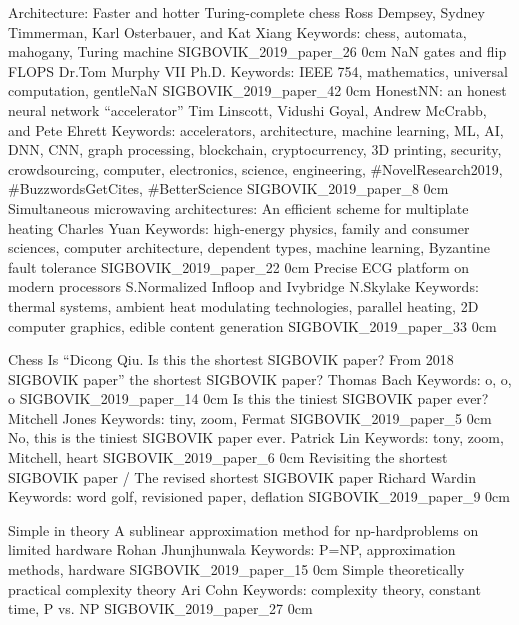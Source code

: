 \addtrack
	{}{Architecture: Faster and hotter}
\addpaper
	{Turing-complete chess}
	{Ross Dempsey, Sydney Timmerman, Karl Osterbauer, and Kat Xiang}
	{Keywords: chess, automata, mahogany, Turing machine}
	{SIGBOVIK_2019_paper_26}
	{0cm}
	{}
\addpaper
	{NaN gates and flip FLOPS}
	{Dr.\@ Tom Murphy VII Ph.D.}
	{Keywords: IEEE 754, mathematics, universal computation, gentleNaN}
	{SIGBOVIK_2019_paper_42}
	{0cm}
	{}
\addpaper
	{HonestNN: an honest neural network ``accelerator''}
	{Tim Linscott, Vidushi Goyal, Andrew McCrabb, and Pete Ehrett}
	{Keywords: accelerators, architecture, machine learning, ML, AI, DNN, CNN, graph processing, blockchain, cryptocurrency, 3D printing, security, crowdsourcing, computer, electronics, science, engineering, \#NovelResearch2019, \#BuzzwordsGetCites, \#BetterScience}
	{SIGBOVIK_2019_paper_8}
	{0cm}
	{}
\addpaper
	{Simultaneous microwaving architectures: An efficient scheme for multiplate heating}
	{Charles Yuan}
	{Keywords: high-energy physics, family and consumer sciences, computer architecture, dependent types, machine learning, Byzantine fault tolerance}
	{SIGBOVIK_2019_paper_22}
	{0cm}
	{}
\addpaper
	{Precise ECG platform on modern processors}
	{S.\@ Normalized Infloop and Ivybridge N.\@ Skylake}
	{Keywords: thermal systems, ambient heat modulating technologies, parallel heating, 2D computer graphics, edible content generation}
	{SIGBOVIK_2019_paper_33}
	{0cm}
	{}

\addtrack
	{}{Chess}
\addpaper
	{Is ``Dicong Qiu. Is this the shortest SIGBOVIK paper? From 2018 SIGBOVIK paper'' the shortest SIGBOVIK paper?}
	{Thomas Bach}
	{Keywords: o, o, o}
	{SIGBOVIK_2019_paper_14}
	{0cm}
	{}
\addpaper
	{Is this the tiniest SIGBOVIK paper ever?}
	{Mitchell Jones}
	{Keywords: tiny, zoom, Fermat}
	{SIGBOVIK_2019_paper_5}
	{0cm}
	{}
\addpaper
	{No, this is the tiniest SIGBOVIK paper ever.}
	{Patrick Lin}
	{Keywords: tony, zoom, Mitchell, heart}
	{SIGBOVIK_2019_paper_6}
	{0cm}
	{}
\addpaper
	{Revisiting the shortest SIGBOVIK paper / The revised shortest SIGBOVIK paper}
	{Richard Wardin}
	{Keywords: word golf, revisioned paper, deflation}
	{SIGBOVIK_2019_paper_9}
	{0cm}
	{}

\addtrack
	{}{Simple in theory}
\addpaper
	{A sublinear approximation method for np-hardproblems on limited hardware}
	{Rohan Jhunjhunwala}
	{Keywords: P=NP, approximation methods, hardware}
	{SIGBOVIK_2019_paper_15}
	{0cm}
	{}
\addpaper
	{Simple theoretically practical complexity theory}
	{Ari Cohn}
	{Keywords: complexity theory, constant time, P vs. NP}
	{SIGBOVIK_2019_paper_27}
	{0cm}
	{}


